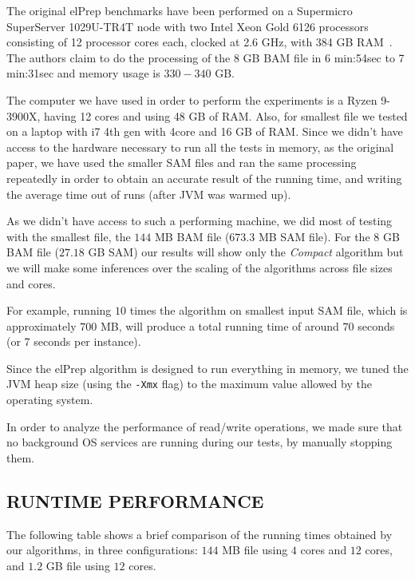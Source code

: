 \documentclass[a4paper,twoside]{article}
\begin{document}
The original elPrep benchmarks have been performed on a Supermicro SuperServer 1029U-TR4T node with two
Intel Xeon Gold 6126 processors consisting of 12 processor cores each, clocked at 2.6 GHz, with 384 GB RAM~\cite{costanza:2019}. The authors claim to do the processing of the 8 GB BAM file in 6 min:54sec to 7 min:31sec and memory usage is $330-340$ GB\@.

The computer we have used in order to perform the experiments is a Ryzen 9-3900X, having 12 cores and using 48 GB of RAM\@. Also, for smallest file we tested on a laptop with i7 4th gen with 4core and 16 GB of RAM.
Since we didn't have access to the hardware necessary to run all the tests in memory, as the original paper, we have used the smaller SAM files and ran the same processing repeatedly in order to obtain an accurate result of the running time, and writing the average time out of runs (after JVM was warmed up).

As we didn't have access to such a performing machine, we did most of testing with the smallest file, the $144$ MB BAM file ($673.3$ MB SAM file). For the $8$ GB BAM file ($27.18$ GB SAM) our results will show only the {\textit{Compact} } algorithm but we will make some inferences over the scaling of the algorithms across file sizes and cores.

For example, running $10$ times the algorithm on smallest input SAM file, which is approximately $700$ MB, will produce a total running time of around $70$ seconds (or 7 seconds per instance). 

Since the elPrep algorithm is designed to run everything in memory, we tuned the JVM heap size (using the \texttt{-Xmx} flag) to the maximum value allowed by the operating system. 

In order to analyze the performance of read/write operations, we made sure that no background OS services are running during our tests, by manually stopping them.


\subsection{\uppercase{Runtime performance}}
\label{subsec:runtimeperf}

The following table shows a brief comparison of the running times obtained by our algorithms, in three configurations: $144$ MB file using $4$ cores and $12$ cores, and $1.2$ GB file using $12$ cores. 
\end{document}
